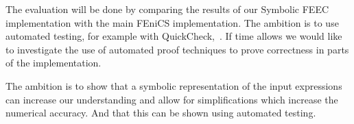 \documentclass{scrartcl}
\begin{document}
The evaluation will be done by comparing the results of our Symbolic FEEC
implementation with the main FEniCS implementation.
The ambition is to use automated testing, for example with
QuickCheck,~\cite{claessen_quickcheck_2000}.
If time allows we would like to investigate the use of automated proof
techniques to prove correctness in parts of the implementation.



The ambition is to show that a symbolic representation of the input expressions
can increase our understanding and allow for simplifications which increase the
numerical accuracy. And that this can be shown using automated testing.








\end{document}

